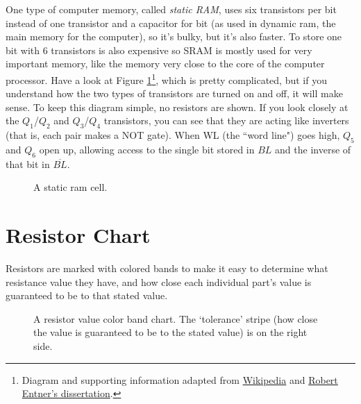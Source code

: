 One type of computer memory, called \emph{static RAM}, uses six transistors per bit instead of one transistor and a capacitor for bit (as used in dynamic ram, the main memory for the computer), so it's bulky, but it's also faster. To store one bit with 6 transistors is also expensive so SRAM is mostly used for very important memory, like the memory very close to the core of the computer processor. Have a look at Figure \ref{fig:sram}\footnote{Diagram and supporting information adapted from {\color{webblue}\href{https://en.wikipedia.org/wiki/Static_random-access_memory}{Wikipedia}} and {\color{webblue}\href{https://www.entner.net/sites/default/files/diss-entner-final-v1.pdf}{Robert Entner's dissertation}}.}, 
which is pretty complicated, but if you understand how the two types of transistors are turned on and off, it will make sense. To keep this diagram simple, no resistors are shown. If you look closely at the $Q_1$/$Q_2$ and $Q_3$/$Q_4$ transistors, you can see that they are acting like inverters (that is, each pair makes a NOT gate). When WL (the ``word line") goes high, $Q_5$ and $Q_6$ open up, allowing access to the single bit stored in $BL$ and the inverse of that bit in $\overline{BL}$. 


\begin{figure}[h!]
\begin{center}

\caption{A static ram cell.} 
\label{fig:sram}
\end{center}
\end{figure}


\newpage


\section*{Resistor Chart}

Resistors are marked with colored bands to make it easy to determine what resistance value they have, and how close each individual part's value is guaranteed to be to that stated value.


\begin{figure}[!ht]
\begin{center}
\end{center}
\caption{A resistor value color band chart. The `tolerance' stripe (how close the value is guaranteed to be to the stated value) is on the right side. }
\label{fig:resistorchart}
\end{figure}
